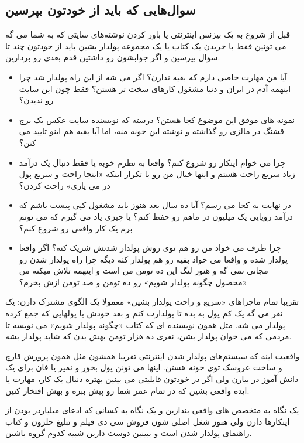\subsection*{سوال‌هایی که باید از خودتون بپرسین}
قبل از شروع به یک بیزنس اینترنتی یا باور کردن نوشته‌های سایتی که به شما می گه می تونین فقط با خریدن یک کتاب یا یک مجموعه پولدار بشین باید از خودتون چند تا سوال بپرسین و اگر جوابشون رو داشتین قدم بعدی رو بردارین.
\begin{itemize}
	\item آیا من مهارت خاصی دارم که بقیه ندارن؟ اگر می شه از این راه پولدار شد چرا اینهمه آدم در ایران و دنیا مشغول کارهای سخت تر هستن؟ فقط چون این سایت رو ندیدن؟
	\item نمونه های موفق این موضوع کجا هستن؟ درسته که نویسنده سایت عکس یک برج قشنگ در مالزی رو گذاشته و نوشته این خونه منه، اما آیا بقیه هم اینو تایید می کنن؟
	\item چرا می خوام اینکار رو شروع کنم؟ واقعا به نظرم خوبه یا فقط دنبال یک درآمد زیاد سریع راحت هستم و اینها خیال من رو با تکرار اینکه «اینجا راحت و سریع پول در می یاری» راحت کردن؟
	\item در نهایت به کجا می رسم؟ آیا ده سال بعد هنوز باید مشغول کپی پیست باشم که درآمد رویایی یک میلیون در ماهم رو حفظ کنم؟ یا چیزی یاد می گیرم که می تونم برم یک کار واقعی رو شروع کنم؟
	\item چرا طرف می خواد من رو هم توی روش پولدار شدنش شریک کنه؟ اگر واقعا پولدار شده و واقعا می خواد بقیه رو هم پولدار کنه دیگه چرا راه پولدار شدن رو مجانی نمی گه و هنوز لنگ این ده تومن من است و اینهمه تلاش میکنه من «محصول چگونه پولدار شویم» رو ده تومن و صد تومن ازش بخرم؟
 
\end{itemize}
تقریبا تمام ماجراهای «سریع و راحت پولدار بشین» معمولا یک الگوی مشترک دارن: یک نفر می گه یک کم پول به بده تا پولدارت کنم و بعد خودش با پولهایی که جمع کرده پولدار می شه. مثل همون نویسنده ای که کتاب «چگونه پولدار شویم» می نویسه تا مردمی که می خوان پولدار بشن، نفری ده هزار تومن بهش بدن که شاید پولدار بشه.

واقعیت اینه که سیستم‌های پولدار شدن اینترنتی تقریبا همشون مثل همون پرورش قارچ و ساخت عروسک توی خونه هستن. اینها می تونن پول بخور و نمیر یا فان برای یک دانش آموز در بیارن ولی اگر در خودتون قابلیتی می بینین بهتره دنبال یک کار، مهارت یا ایده واقعی بشین که در تمام عمر شما رو پیش ببره و بهش افتخار کنین.

 یک نگاه به متخصص های واقعی بندازین و یک نگاه به کسانی که ادعای میلیاردر بودن از اینکارها دارن ولی هنوز شغل اصلی شون فروش سی دی فیلم و تبلیغ حلزون و کتاب راهنمای پولدار شدن است و ببینین دوست دارین شبیه کدوم گروه باشین.
